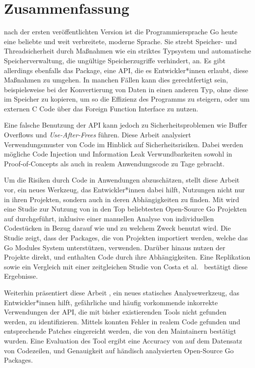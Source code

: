 \chapter*{Zusammenfassung}

 nach der ersten veröffentlichten Version ist die Programmiersprache Go heute eine beliebte und
weit verbreitete, moderne Sprache.
Sie strebt Speicher- und Threadsicherheit durch Maßnahmen wie ein striktes Typsystem und automatische
Speicherverwaltung, die ungültige Speicherzugriffe verhindert, an.
Es gibt allerdings ebenfalls das \unsafe{} Package, eine API, die es Entwickler*innen erlaubt, diese
Maßnahmen zu umgehen.
In manchen Fällen kann dies gerechtfertigt sein, beispielsweise bei der Konvertierung von Daten in einen anderen Typ,
ohne diese im Speicher zu kopieren, um so die Effizienz des Programms zu steigern, oder um externen C Code über das
Foreign Function Interface zu nutzen.

Eine falsche Benutzung der \unsafe{} API kann jedoch zu Sicherheitsproblemen wie Buffer Overflows und
\textit{Use-After-Frees} führen.
Diese Arbeit analysiert Verwendungsmuster von \unsafe{} Code im Hinblick auf Sicherheitsrisiken.
Dabei werden mögliche Code Injection und Information Leak Verwundbarkeiten sowohl in Proof-of-Concepts als auch in
realem Anwendungscode zu Tage gebracht.

Um die Risiken durch \unsafe{} Code in Anwendungen abzuschätzen, stellt diese Arbeit \toolGeiger{} vor, ein neues
Werkzeug, das Entwickler*innen dabei hilft, \unsafe{} Nutzungen nicht nur in ihren Projekten, sondern auch in deren
Abhängigkeiten zu finden.
Mit \toolGeiger{} wird eine Studie zur Nutzung von \unsafe{} in den Top \projsTotal{} beliebtesten Open-Source Go
Projekten auf \github{} durchgeführt, inklusive einer manuellen Analyse von \numberLabeledCodeSnippets{} individuellen
Codestücken in Bezug darauf wie und zu welchem Zweck \unsafe{} benutzt wird.
Die Studie zeigt, dass \percentageUnsafePackages{} der Packages, die von Projekten importiert werden, welche das Go
Modules System unterstützen, \unsafe{} verwenden.
Darüber hinaus nutzen \percentageUnsafeProjects{} der Projekte \unsafe{} direkt, und
\percentageUnsafeTransitiveWithDependencies{} enthalten \unsafe{} Code durch ihre Abhängigkeiten.
Eine Replikation sowie ein Vergleich mit einer zeitgleichen Studie von Costa et al.~\cite{costa2020} bestätigt diese
Ergebnisse.

Weiterhin präsentiert diese Arbeit \toolSafer{}, ein neues statisches Analysewerkzeug, das Entwickler*innen hilft,
 gefährliche und häufig vorkommende inkorrekte Verwendungen der \unsafe{} \acrshort{API}, die mit bisher
existierenden Tools nicht gefunden werden, zu identifizieren.
Mittels \toolSafer{} konnten \numberBugsFixed{} Fehler in realem Code gefunden und entsprechende Patches eingereicht
werden, die von den Maintainern bestätigt wurden.
Eine Evaluation des Tool ergibt eine Accuracy von \goSaferEvaluationDatasetGosaferAccuracy{} auf dem Datensatz von
\unsafe{} Codezeilen, und \goSaferEvaluationPackagesGosaferAccuracy{} Genauigkeit auf händisch analysierten Open-Source
Go Packages.
